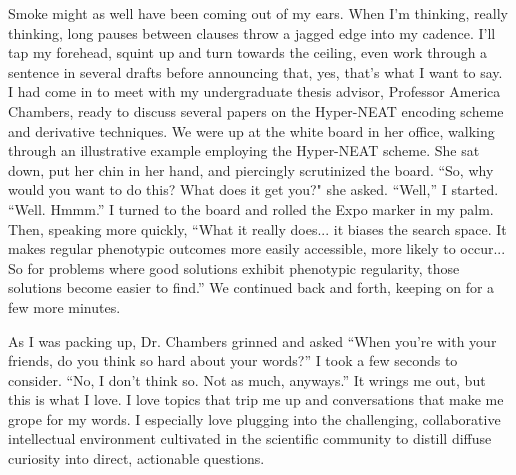 Smoke might as well have been coming out of my ears.
When I'm thinking, really thinking, long pauses between clauses throw a jagged edge into my cadence.
I'll tap my forehead, squint up and turn towards the ceiling, even work through a sentence in several drafts before announcing that, yes, that's what I want to say.
I had come in to meet with my undergraduate thesis advisor, Professor America Chambers, ready to discuss several papers on the Hyper-NEAT encoding scheme and derivative techniques.
We were up at the white board in her office, walking through an illustrative example employing the Hyper-NEAT scheme.
She sat down, put her chin in her hand, and piercingly scrutinized the board.
``So, why would you want to do this? What does it get you?" she asked.
``Well,'' I started.
``Well.
Hmmm.''
I turned to the board and rolled the Expo marker in my palm.
Then, speaking more quickly,
``What it really does... it biases the search space.
It makes regular phenotypic outcomes more easily accessible, more likely to occur...
So for problems where good solutions exhibit phenotypic regularity, those solutions become easier to find.''
We continued back and forth, keeping on for a few more minutes.

As I was packing up, Dr. Chambers grinned and asked ``When you're with your friends, do you think so hard about your words?''
I took a few seconds to consider.
``No, I don't think so.
Not as much, anyways.''
It wrings me out, but this is what I love.
I love topics that trip me up and conversations that make me grope for my words.
I especially love plugging into the challenging, collaborative intellectual environment cultivated in the scientific community to distill diffuse curiosity into direct, actionable questions.

